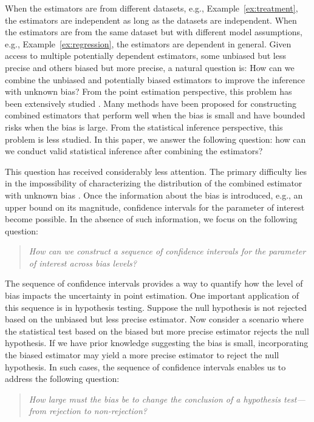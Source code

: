 \documentclass[11pt]{article}
\numberwithin{equation}{section}
\theoremstyle{definition}
\begin{document}
When the estimators are from different datasets, e.g., Example~\ref{ex:treatment}, the estimators are independent as long as the datasets are independent. When the estimators are from the same dataset but with different model assumptions, e.g., Example~\ref{ex:regression}, the estimators are dependent in general. Given access to multiple potentially dependent estimators, some unbiased but less precise and others biased but more precise, a natural question is: How can we combine the unbiased and potentially biased estimators to improve the inference with unknown bias? From the point estimation perspective, this problem has been extensively studied \citep{bickel1984parametric,green1991james, giles1993pre,chen2015data,athey2020combining,de2020empirical, rosenman2023combining,gao2023pretest, yang2025cross}. Many methods have been proposed for constructing combined estimators that perform well when the bias is small and have bounded risks when the bias is large. From the statistical inference perspective, this problem is less studied. In this paper, we answer the following question: how can we conduct valid statistical inference after combining the estimators?

This question has received considerably less attention. The primary difficulty lies in the impossibility of characterizing the distribution of the combined estimator with unknown bias \citep{armstrong2025adapting}.
Once the information about the bias is introduced, e.g., an upper bound on its magnitude, confidence intervals for the parameter of interest become possible. In the absence of such information, we focus on the following question:
\begin{quote}
  \textit{How can we construct a sequence of confidence intervals for the parameter of interest across bias levels?}
\end{quote}

The sequence of confidence intervals provides a way to quantify how the level of bias impacts the uncertainty in point estimation. One important application of this sequence is in hypothesis testing. Suppose the null hypothesis is not rejected based on the unbiased but less precise estimator. Now consider a scenario where the statistical test based on the biased but more precise estimator rejects the null hypothesis. If we have prior knowledge suggesting the bias is small, incorporating the biased estimator may yield a more precise estimator to reject the null hypothesis. In such cases, the sequence of confidence intervals enables us to address the following question:
\begin{quote}
  \textit{How large must the bias be to change the conclusion of a hypothesis test—from rejection to non-rejection?}
\end{quote}
\end{document}
